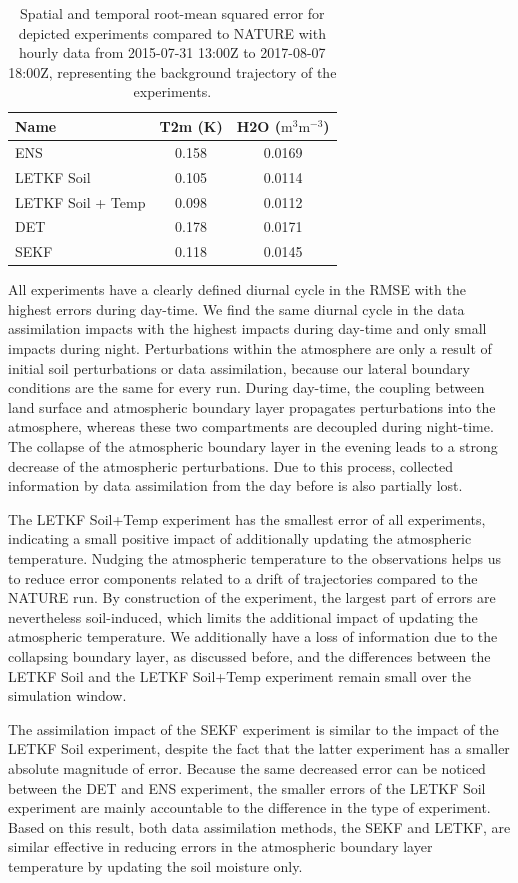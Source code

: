 \documentclass[HESSD, manuscript]{copernicus}
\begin{document}
\begin{table}[ht]
	\caption{
		Spatial and temporal root-mean squared error for depicted experiments compared to NATURE with hourly data from 2015-07-31 13:00Z to 2017-08-07 18:00Z, representing the background trajectory of the experiments.\label{tab:exp_rmse}
	}
	\begin{tabular}{l|c|c}
		Name & T2m (K) & H2O ($\text{m}^3 \text{m}^{-3}$)\\
		\hline
		ENS & 0.158 & 0.0169 \\
		LETKF Soil & 0.105 & 0.0114 \\
		LETKF Soil + Temp & 0.098 & 0.0112 \\
		DET & 0.178 & 0.0171 \\
		SEKF & 0.118 & 0.0145
	\end{tabular}
\end{table}

All experiments have a clearly defined diurnal cycle in the RMSE with the highest errors during day-time.
We find the same diurnal cycle in the data assimilation impacts with the highest impacts during day-time and only small impacts during night.
Perturbations within the atmosphere are only a result of initial soil perturbations or data assimilation, because our lateral boundary conditions are the same for every run.
During day-time, the coupling between land surface and atmospheric boundary layer propagates perturbations into the atmosphere, whereas these two compartments are decoupled during night-time. 
The collapse of the atmospheric boundary layer in the evening leads to a strong decrease of the atmospheric perturbations.
Due to this process, collected information by data assimilation from the day before is also partially lost.

The LETKF Soil+Temp experiment has the smallest error of all experiments, indicating a small positive impact of additionally updating the atmospheric temperature.
Nudging the atmospheric temperature to the observations helps us to reduce error components related to a drift of trajectories compared to the NATURE run.
By construction of the experiment, the largest part of errors are nevertheless soil-induced, which limits the additional impact of updating the atmospheric temperature.
We additionally have a loss of information due to the collapsing boundary layer, as discussed before, and the differences between the LETKF Soil and the LETKF Soil+Temp experiment remain small over the simulation window.

The assimilation impact of the SEKF experiment is similar to the impact of the LETKF Soil experiment, despite the fact that the latter experiment has a smaller absolute magnitude of error.
Because the same decreased error can be noticed between the DET and ENS experiment, the smaller errors of the LETKF Soil experiment are mainly accountable to the difference in the type of experiment.
Based on this result, both data assimilation methods, the SEKF and LETKF, are similar effective in reducing errors in the atmospheric boundary layer temperature by updating the soil moisture only.\\
\end{document}
